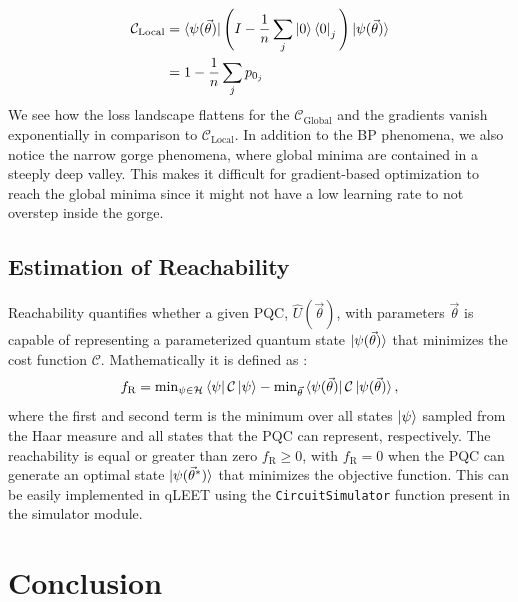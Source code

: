 \begin{equation}
\begin{split}
    \mathcal{C}_{\text{Local}} &= \bra{\psi(\vec{\theta})} \Bigg(I - \frac{1}{n}\sum_j \ket{0}\bra{0}_j\Bigg) \ket{\psi(\vec{\theta})} \\
    &= 1 - \frac{1}{n}\sum_j p_{0_j}
\end{split}
\end{equation}
We see how the loss landscape flattens for the $\mathcal{C}_{\text{Global}}$ and the gradients vanish exponentially in comparison to  $\mathcal{C}_{\text{Local}}$. In addition to the BP phenomena, we also notice the narrow gorge phenomena, where global minima are contained in a steeply deep valley. This makes it difficult for gradient-based optimization to reach the global minima since it might not have a low learning rate to not overstep inside the gorge. 

\subsection{Estimation of Reachability}

Reachability quantifies whether a given PQC, $\hat{U}(\vec{\theta})$, with parameters $\vec{\theta}$ is capable of representing a parameterized quantum state $\ket{\psi(\vec{\theta})}$ that minimizes the cost function $\mathcal{C}$. Mathematically it is defined as \cite{PhysRevLett.124.090504}:
\begin{equation}
f_\text{R}=\text{min}_{\psi\in\mathcal{H}}\bra{\psi}\mathcal{C}\ket{\psi}-\text{min}_{\vec{\theta}}\bra{\psi(\vec{\theta})}\mathcal{C}\ket{\psi(\vec{\theta})},
\end{equation}
where the first and second term is the minimum over all states $\ket{\psi}$ sampled from the Haar measure and all states that the PQC can represent, respectively. The reachability is equal or greater than zero $f_\text{R}\ge0$, with $f_\text{R}=0$ when the PQC can generate an optimal state $\ket{\psi(\vec{\theta}^*)}$ that minimizes the objective function. This can be easily implemented in qLEET using the \texttt{CircuitSimulator} function present in the simulator module.  

\section{\label{sec:conclusion}Conclusion}

